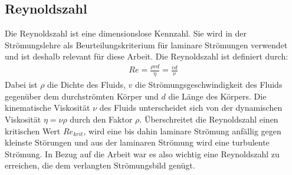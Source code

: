 \subsection{Reynoldszahl}
Die Reynoldszahl ist eine dimensionslose Kennzahl. Sie wird in der Str\"{o}mungslehre als Beurteilungskriterium f\"{u}r laminare Str\"{o}mungen verwendet und ist deshalb relevant f\"{u}r diese Arbeit. Die Reynoldszahl ist definiert durch:
\begin{align*}
{Re} = \frac{\rho vd}{\eta} = \frac{vd}{\nu}
\end{align*}
Dabei ist \(\rho\) die Dichte des Fluids, \(v\) die Str\"{o}mungsgeschwindigkeit des Fluids gegen\"{u}ber dem durchstr\"{o}mten K\"{o}rper und \(d\) die L\"{a}nge des K\"{o}rpers. Die kinematische Viskosit\"{a}t \(\nu\) des Fluids unterscheidet sich von der dynamischen Viskosit\"{a}t \(\eta = \nu \rho\) durch den Faktor \(\rho\). \"{U}berschreitet die Reynoldszahl einen kritischen Wert \({Re}_{krit}\), wird eine bis dahin laminare Str\"{o}mung anf\"{a}llig gegen kleinste St\"{o}rungen und aus der laminaren Str\"{o}mung wird eine turbulente Str\"{o}mung. In Bezug auf die Arbeit war es also wichtig eine Reynoldszahl zu erreichen, die dem verlangten Str\"{o}mungsbild gen\"{u}gt\cite{reynolds}.